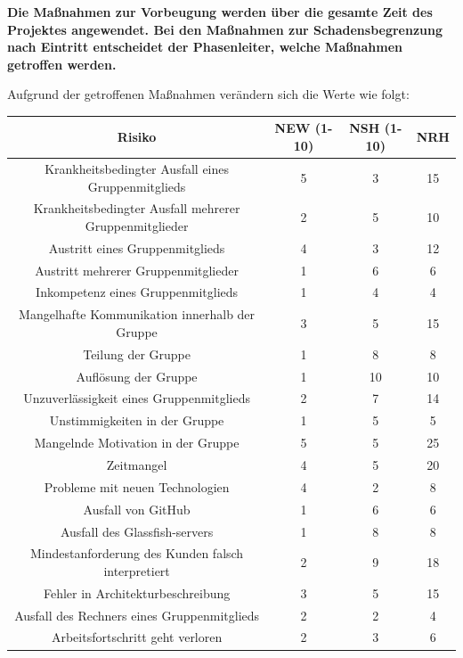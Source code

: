 \documentclass[fontsize=12pt,paper=a4,twoside]{scrartcl}
\begin{document}
\newpage
\textbf{Die Maßnahmen zur Vorbeugung werden über die gesamte Zeit des Projektes angewendet. Bei den Maßnahmen zur Schadensbegrenzung nach Eintritt entscheidet der Phasenleiter, welche Maßnahmen getroffen werden.}\\
\bigskip 

Aufgrund der getroffenen Maßnahmen verändern sich die Werte wie folgt:\\
\begin{center}
\begin{tabular}{|c|c|c|c|} \hline
Risiko & NEW (1-10) & NSH (1-10) & NRH\\ \hline
Krankheitsbedingter Ausfall eines Gruppenmitglieds & 5 & 3 & 15\\ \hline
Krankheitsbedingter Ausfall mehrerer Gruppenmitglieder & 2 & 5 & 10\\ \hline
Austritt eines Gruppenmitglieds & 4 & 3 & 12\\ \hline
Austritt mehrerer Gruppenmitglieder & 1 & 6 & 6\\ \hline
Inkompetenz eines Gruppenmitglieds & 1 & 4 & 4\\ \hline
Mangelhafte Kommunikation innerhalb der Gruppe & 3 & 5 & 15\\ \hline
Teilung der Gruppe & 1 & 8 & 8\\ \hline
Auflösung der Gruppe & 1 & 10 & 10\\ \hline
Unzuverlässigkeit eines Gruppenmitglieds & 2 & 7 & 14\\ \hline
Unstimmigkeiten in der Gruppe & 1 & 5 & 5\\ \hline
Mangelnde Motivation in der Gruppe & 5 & 5 & 25\\ \hline
Zeitmangel & 4 & 5 & 20\\ \hline
Probleme mit neuen Technologien & 4 & 2 & 8\\ \hline
Ausfall von GitHub & 1 & 6 & 6\\ \hline
Ausfall des Glassfish-servers & 1 & 8 & 8\\ \hline
Mindestanforderung des Kunden falsch interpretiert & 2 & 9 & 18\\ \hline
Fehler in Architekturbeschreibung & 3 & 5 & 15\\ \hline
Ausfall des Rechners eines Gruppenmitglieds & 2 & 2 & 4\\ \hline
Arbeitsfortschritt geht verloren & 2 & 3 & 6\\ \hline
\end{tabular}
\end{center}
\end{document}

